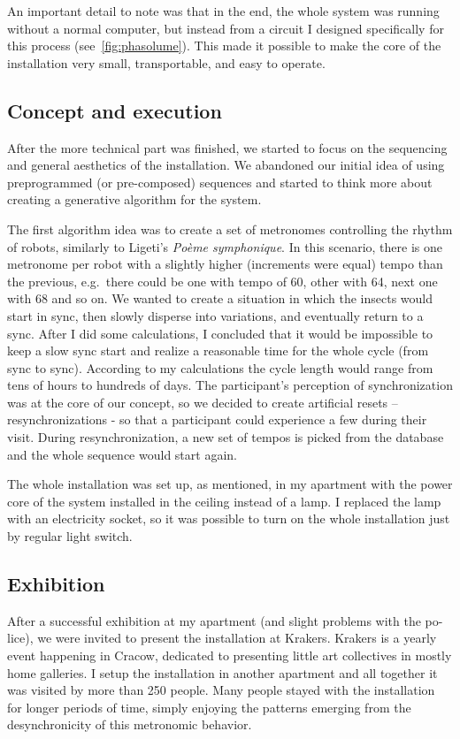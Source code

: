 \documentclass[12pt,a4paper,oneside]{report}
\begin{document}
An important detail to note was that in the end, the whole system was running without a normal computer, but instead from a circuit I designed specifically for this process (see~\ref{fig:phasolume}). This made it possible to make the core of the installation very small, transportable, and easy to operate.

\subsection{Concept and execution}

After the more technical part was finished, we started to focus on the sequencing and general aesthetics of the installation.  We abandoned our initial idea of using preprogrammed (or pre-composed) sequences and started to think more about creating a generative algorithm for the system.

The first algorithm idea was to create a set of metronomes controlling the rhythm of robots, similarly to Ligeti’s \emph{Poème symphonique}. In this scenario, there is one metronome per robot with a slightly higher (increments were equal) tempo than the previous, e.g.\ there could be one with tempo of 60, other with 64, next one with 68 and so on. We wanted to create a situation in which the insects would start in sync, then slowly disperse into variations, and eventually return to a sync. After I did some calculations, I concluded that it would be impossible to keep a slow sync start and realize a reasonable time for the whole cycle (from sync to sync). According to my calculations the cycle length would range from tens of hours to hundreds of days. The participant’s perception of synchronization was at the core of our concept, so we decided to create artificial resets – resynchronizations - so that a participant could experience a few during their visit. During resynchronization, a new set of tempos is picked from the database and the whole sequence would start again.

The whole installation was set up, as mentioned, in my apartment with the power core of the system installed in the ceiling instead of a lamp. I replaced the lamp with an electricity socket, so it was possible to turn on the whole installation just by regular light switch.

\subsection{Exhibition}

After a successful exhibition at my apartment (and slight problems with the po- lice), we were invited to present the installation at Krakers. Krakers is a yearly event happening in Cracow, dedicated to presenting little art collectives in mostly home galleries. I setup the installation in another apartment and all together it was visited by more than 250 people. Many people stayed with the installation for longer periods of time, simply enjoying the patterns emerging from the desynchronicity of this metronomic behavior.
\end{document}
